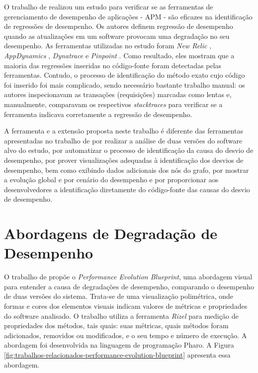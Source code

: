 O trabalho de \citeauthor{Ahmed2016} realizou um estudo para verificar se as ferramentas de gerenciamento de desempenho de aplicações - APM - são eficazes na identificação de regressões de desempenho. Os autores definem regressão de desempenho quando as atualizações em um software provocam uma degradação no seu desempenho. As ferramentas utilizadas no estudo foram \textit{New Relic} \cite{Relic2016}, \textit{AppDynamics} \cite{Appdynamics}, \textit{Dynatrace} \cite{Dynatrace2016} e \textit{Pinpoint} \cite{Pinpoint2016}. Como resultado, eles mostram que a maioria das regressões inseridas no código-fonte foram detectadas pelas ferramentas. Contudo, o processo de identificação do método exato cujo código foi inserido foi mais complicado, sendo necessário bastante trabalho manual: os autores inspecionavam as transações (requisições) marcadas como lentas e, manualmente, comparavam os respectivos \textit{stacktraces} para verificar se a ferramenta indicava corretamente a regressão de desempenho.

A ferramenta e a extensão proposta neste trabalho é diferente das ferramentas apresentadas no trabalho de \citeauthor{Ahmed2016} por realizar a análise de duas versões do software alvo do estudo, por automatizar o processo de identificação da causa do desvio de desempenho, por prover visualizações adequadas à identificação dos desvios de desempenho, bem como exibindo dados adicionais dos nós do grafo, por mostrar a evolução global e por cenário do desempenho e por proporcionar aos desenvolvedores a identificação diretamente do código-fonte das causas do desvio de desempenho.

\section{Abordagens de Degradação de Desempenho} \label{sec:trabalhos-relacionados-adordagens-degradacao-desempenho}

O trabalho de \citeauthor{SandovalAlcocer2013} propõe o \textit{Performance Evolution Blueprint}, uma abordagem visual para entender a causa de degradações de desempenho, comparando o desempenho de duas versões do sistema. Trata-se de uma visualização polimétrica, onde formas e cores dos elementos visuais indicam valores de métricas e propriedades do software analisado. O trabalho utiliza a ferramenta \textit{Rizel} para medição de propriedades dos métodos, tais quais: suas métricas, quais métodos foram adicionados, removidos ou modificados, e o seu tempo e número de execução. A abordagem foi desenvolvida na linguagem de programação Pharo. A Figura \ref{fig:trabalhos-relacionados-performance-evolution-blueprint} apresenta essa abordagem.

